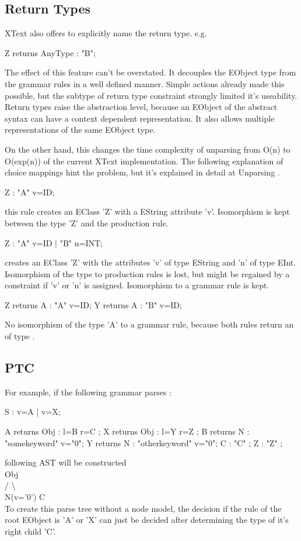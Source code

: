 \subsection{Return Types}
XText also offers to explicitly name the return type. e.g.
\begin{xtxt}
Z returns AnyType	: "B";
\end{xtxt}
The effect of this feature can't be overstated.  It decouples the EObject type from the grammar rules in a well defined manner. Simple actions already made this possible, but the subtype of return type constraint strongly limited it's useability. Return types raise the abstraction level, because an EObject of the abstract syntax can have a context dependent representation. It also allows multiple representations of the same EObject type.

On the other hand, this changes the time complexity of unparsing from O(n) to O(exp(n)) of the current XText implementation. The following explanation of choice mappings hint the problem, but it's explained in detail at Unparsing .
\begin{xtxt}
Z 	:  "A" v=ID;
\end{xtxt}
this rule creates an EClass 'Z' with a EString attribute 'v'. Isomorphism is kept between the type 'Z' and the production rule.
\begin{xtxt}
Z 	:  "A" v=ID  
	|  "B" n=INT;
	\end{xtxt}
creates an EClass 'Z' with the attributes 'v' of type EString and 'n' of type EInt.  Isomorphism of the type to production rules is lost, but might be regained by a constraint if 'v' or 'n' is assigned. Isomorphism to a grammar rule is kept.
\begin{xtxt}
Z returns A : "A" v=ID;
Y returns A : "B" v=ID;
\end{xtxt}
No isomorphism of the type 'A' to a grammar rule, because both rules return an  of type .

\subsection{PTC}

For example, if the following grammar parses :
\begin{xtxt}
S  	:  	v=A 
	| 	v=X;

A returns Obj	: 	l=B r=C   ;
X returns Obj	: 	l=Y r=Z   ;
B returns N  	:  	"somekeyword" 	v="0";
Y returns N  	: 	"otherkeyword" 	v="0";
C 		:  	 "C" ;
Z 		: 	 "Z" ;
\end{xtxt}
following AST will be constructed  \\ 
      Obj			\\
     /   \textbackslash		\\
N(v='0')   C	\\
To create this parse tree without a node model, the decision if the rule of the root EObject is 'A' or 'X' can just be decided after determining the type of it's right child 'C'. \\

